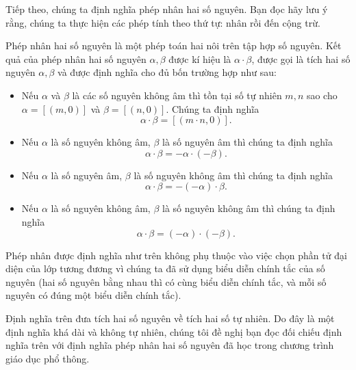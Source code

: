 Tiếp theo, chúng ta định nghĩa phép nhân hai số nguyên. Bạn đọc hãy lưu ý rằng, chúng ta thực hiện các phép tính theo thứ tự: nhân rồi đến cộng trừ.
\begin{definition}
	Phép nhân hai số nguyên là một phép toán hai nôi trên tập hợp số nguyên. Kết quả của phép nhân hai số nguyên $\alpha, \beta$ được kí hiệu là $\alpha\cdot\beta$, được gọi là tích hai số nguyên $\alpha, \beta$ và được định nghĩa cho đủ bốn trường hợp như sau:
	\begin{itemize}[itemsep=0pt]
		\item Nếu $\alpha$ và $\beta$ là các số nguyên không âm thì tồn tại số tự nhiên $m, n$ sao cho $\alpha = [(m, 0)]$ và $\beta = [(n, 0)]$. Chúng ta định nghĩa
		      \[
			      \alpha\cdot\beta = [(m\cdot n, 0)].
		      \]
		\item Nếu $\alpha$ là số nguyên không âm, $\beta$ là số nguyên âm thì chúng ta định nghĩa
		      \[
			      \alpha\cdot\beta = -\alpha\cdot(-\beta).
		      \]
		\item Nếu $\alpha$ là số nguyên âm, $\beta$ là số nguyên không âm thì chúng ta định nghĩa
		      \[
			      \alpha\cdot\beta = -(-\alpha)\cdot \beta.
		      \]
		\item Nếu $\alpha$ là số nguyên không âm, $\beta$ là số nguyên không âm thì chúng ta định nghĩa
		      \[
			      \alpha\cdot\beta = (-\alpha)\cdot(-\beta).
		      \]
	\end{itemize}
\end{definition}

Phép nhân được định nghĩa như trên không phụ thuộc vào việc chọn phần tử đại diện của lớp tương đương vì chúng ta đã sử dụng biểu diễn chính tắc của số nguyên (hai số nguyên bằng nhau thì có cùng biểu diễn chính tắc, và mỗi số nguyên có đúng một biểu diễn chính tắc).

Định nghĩa trên đưa tích hai số nguyên về tích hai số tự nhiên. Do đây là một định nghĩa khá dài và không tự nhiên, chúng tôi đề nghị bạn đọc đối chiếu định nghĩa trên với định nghĩa phép nhân hai số nguyên đã học trong chương trình giáo dục phổ thông.

